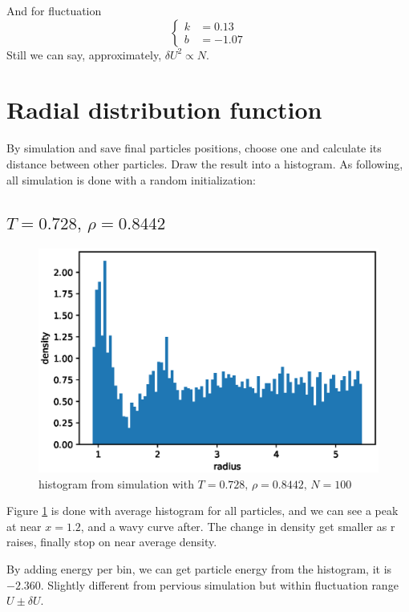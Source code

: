 \documentclass[UTF8,a4paper]{article}
\begin{document}
And for fluctuation
\begin{equation}
	\left\{
		\begin{aligned}
			k &= 0.13\\
			b &= -1.07
		\end{aligned}
	\right.
\end{equation}
Still we can say, approximately, $\delta U^2\propto N$.

\section{Radial distribution function}
By simulation and save final particles positions, choose one and calculate its distance between other particles. Draw the result into a histogram. As following, 
all simulation is done with a random initialization:

\subsection{$T =0.728,\, \rho = 0.8442$}
\begin{figure}[h]
	\centering
	\includegraphics[height=0.2\textheight]{fig/exp1_rdf_peri_1.eps}
	\caption{histogram from simulation with $T =0.728,\, \rho = 0.8442,\, N=100$}
	\label{fig:rdf-1}
\end{figure}
Figure \ref{fig:rdf-1} is done with average histogram for all particles, and we can see a peak at near $x = 1.2$, and a wavy curve after. The change in density get smaller as 
r raises, finally stop on near average density.

By adding energy per bin, we can get particle energy from the histogram, it is $-2.360$. Slightly different from pervious simulation but within fluctuation range $U\pm\delta U$.
\end{document}
